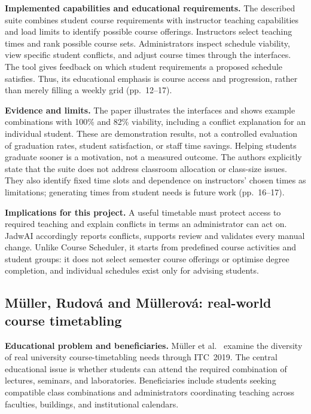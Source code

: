 \textbf{Implemented capabilities and educational requirements.} The described suite combines student course requirements with instructor teaching capabilities and load limits to identify possible course offerings. Instructors select teaching times and rank possible course sets. Administrators inspect schedule viability, view specific student conflicts, and adjust course times through the interfaces. The tool gives feedback on which student requirements a proposed schedule satisfies. Thus, its educational emphasis is course access and progression, rather than merely filling a weekly grid (pp.~12--17).

\textbf{Evidence and limits.} The paper illustrates the interfaces and shows example combinations with 100\% and 82\% viability, including a conflict explanation for an individual student. These are demonstration results, not a controlled evaluation of graduation rates, student satisfaction, or staff time savings. Helping students graduate sooner is a motivation, not a measured outcome. The authors explicitly state that the suite does not address classroom allocation or class-size issues. They also identify fixed time slots and dependence on instructors' chosen times as limitations; generating times from student needs is future work (pp.~16--17).

\textbf{Implications for this project.} A useful timetable must protect access to required teaching and explain conflicts in terms an administrator can act on. JadwAI accordingly reports conflicts, supports review and validates every manual change. Unlike Course Scheduler, it starts from predefined course activities and student groups: it does not select semester course offerings or optimise degree completion, and individual schedules exist only for advising students.

\subsection{Müller, Rudová and Müllerová: real-world course timetabling}
\textbf{Educational problem and beneficiaries.} Müller et al.~\cite{muller2025itc} examine the diversity of real university course-timetabling needs through ITC~2019. The central educational issue is whether students can attend the required combination of lectures, seminars, and laboratories. Beneficiaries include students seeking compatible class combinations and administrators coordinating teaching across faculties, buildings, and institutional calendars.

